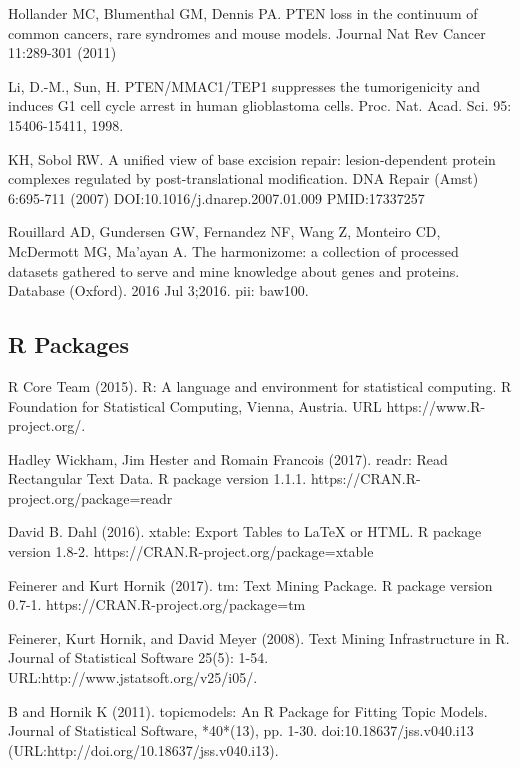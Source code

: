 \documentclass[preprint, 8pt]{elsarticle}
\theoremstyle{definition}
\begin{document}
\begin{table}[H]
\begin{thebibliography}{00}
Hollander MC, Blumenthal GM, Dennis PA. 
\newblock PTEN loss in the continuum of common cancers, rare syndromes and mouse models.
\newblock Journal Nat Rev Cancer 11:289-301 (2011)

Li, D.-M., Sun, H. 
\newblock PTEN/MMAC1/TEP1 suppresses the tumorigenicity and induces G1 cell cycle arrest in human glioblastoma cells. 
\newblock Proc. Nat. Acad. Sci. 95: 15406-15411, 1998. 

 KH, Sobol RW.
\newblock A unified view of base excision repair: lesion-dependent protein complexes regulated by post-translational modification.
\newblock DNA Repair (Amst) 6:695-711 (2007) DOI:10.1016/j.dnarep.2007.01.009 PMID:17337257

 Rouillard AD, Gundersen GW, Fernandez NF, Wang Z, Monteiro CD, McDermott MG, Ma'ayan A. 
\newblock The harmonizome: a collection of processed datasets gathered to serve and mine knowledge about genes and proteins. 
\newblock Database (Oxford). 2016 Jul 3;2016. pii: baw100. 

\subsection{R Packages}

R Core Team (2015). 
\newblock R: A language and environment for statistical computing. R Foundation for Statistical Computing, Vienna, Austria.
\newblock URL https://www.R-project.org/.

 Hadley Wickham, Jim Hester and Romain Francois (2017). readr: Read
\newblock Rectangular Text Data. R package version 1.1.1.
\newblock https://CRAN.R-project.org/package=readr

 David B. Dahl (2016). 
\newblock xtable: Export Tables to LaTeX or HTML. R package version 1.8-2.
\newblock https://CRAN.R-project.org/package=xtable

  Feinerer and Kurt Hornik (2017).
\newblock tm: Text Mining Package. 
\newblock R package version 0.7-1. https://CRAN.R-project.org/package=tm

  Feinerer, Kurt Hornik, and David Meyer (2008). 
\newblock Text Mining Infrastructure in R. 
\newblock Journal of Statistical Software 25(5): 1-54. URL:http://www.jstatsoft.org/v25/i05/.

 B and Hornik K (2011).
\newblock topicmodels: An R Package for Fitting Topic Models.
\newblock Journal of Statistical Software, *40*(13), pp. 1-30. doi:10.18637/jss.v040.i13 (URL:http://doi.org/10.18637/jss.v040.i13).


\end{thebibliography}
\end{table}
\end{document}

